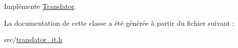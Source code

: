 Implémente \hyperlink{class_translator_a31e719b4e290a359ddbb78132bf3f494}{Translator}.



La documentation de cette classe a été générée à partir du fichier suivant \+:\begin{DoxyCompactItemize}
\item 
src/\hyperlink{translator__it_8h}{translator\+\_\+it.\+h}\end{DoxyCompactItemize}
